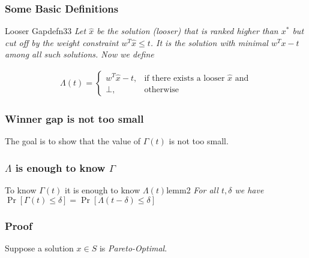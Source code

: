 \begin{frame}
    \frametitle{Some Basic Definitions}

    \begin{define}{Looser Gap}{defn33}
        \textit{Let $\hat{x}$ be the solution (looser) that is ranked higher than $x^{*}$
            but cut off by the weight constraint $w^T \hat{x} \leq t$. It is the solution with
            minimal $w^T x - t$ among all such solutions. Now we define}

        \begin{align*}
            \Lambda(t) =
            \begin{cases}
                w^T \hat{x} - t, & \text{if there exists a looser $\hat{x}$ and} \\
                \bot,            & \text{otherwise}
            \end{cases}
        \end{align*}
    \end{define}

\end{frame}

\begin{frame}
    \frametitle{Winner gap is not too small}

    \begin{center}
        The goal is to show that the value of $\Gamma(t)$ is not too small.
    \end{center}

\end{frame}

\begin{frame}
    \frametitle{$\Lambda$ is enough to know $\Gamma$}

    \begin{lemm}{To know $\Gamma(t)$ it is enough to know $\Lambda(t)$}{lemm2}
        \textit{For all $t, \delta$ we have $\Pr[\Gamma(t) \leq \delta] = \Pr[\Lambda(t - \delta) \leq \delta]$}
    \end{lemm}

\end{frame}

\begin{frame}
    \frametitle{Proof}

    Suppose a solution $x \in S$ is \textit{Pareto-Optimal}.

\end{frame}


